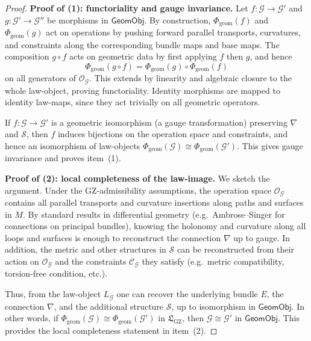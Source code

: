 \documentclass[11pt]{book}
\theoremstyle{plain}
\theoremstyle{definition}
\newcommand{\GZLS}{\ensuremath{\mathfrak{L}_{\mathrm{GZ}}}}       \newcommand{\GZLT}{\ensuremath{M_{!w}}}                           \newcommand{\GZLOC}{\ensuremath{A_M}}                             \newcommand{\GZLCurv}{\ensuremath{\mathcal{F}_{\mathrm{law}}}}
\begin{document}
\begin{proof}
\textbf{Proof of (1): functoriality and gauge invariance.}
Let \(f:\mathcal{G}\to\mathcal{G}'\) and
\(g:\mathcal{G}'\to\mathcal{G}''\) be morphisms in
\(\mathsf{GeomObj}\).  By construction,
\(\Phi_{\mathrm{geom}}(f)\) and \(\Phi_{\mathrm{geom}}(g)\) act on
operations by pushing forward parallel transports, curvatures, and
constraints along the corresponding bundle maps and base maps.  The
composition \(g\circ f\) acts on geometric data by first applying
\(f\) then \(g\), and hence
\[
  \Phi_{\mathrm{geom}}(g\circ f)
  =
  \Phi_{\mathrm{geom}}(g)\circ\Phi_{\mathrm{geom}}(f)
\]
on all generators of \(\mathcal{O}_{\mathcal{G}}\).  This extends by
linearity and algebraic closure to the whole law-object, proving
functoriality.  Identity morphisms are mapped to identity law-maps,
since they act trivially on all geometric operators.

If \(f:\mathcal{G}\to\mathcal{G}'\) is a geometric isomorphism (a
gauge transformation) preserving \(\nabla\) and \(\mathcal{S}\),
then \(f\) induces bijections on the operation space and constraints,
and hence an isomorphism of law-objects
\(\Phi_{\mathrm{geom}}(\mathcal{G})\cong\Phi_{\mathrm{geom}}(\mathcal{G}')\).
This gives gauge invariance and proves item~\textnormal{(1)}.



\medskip\noindent
\textbf{Proof of (2): local completeness of the law-image.}
We sketch the argument.  Under the GZ-admissibility assumptions, the
operation space \(\mathcal{O}_{\mathcal{G}}\) contains all parallel
transports and curvature insertions along paths and surfaces in \(M\).
By standard results in differential geometry (e.g.\ Ambrose–Singer for
connections on principal bundles), knowing the holonomy and curvature
along all loops and surfaces is enough to reconstruct the connection
\(\nabla\) up to gauge.  In addition, the metric and other structures
in \(\mathcal{S}\) can be reconstructed from their action on
\(\mathcal{O}_{\mathcal{G}}\) and the constraints
\(\mathcal{C}_{\mathcal{G}}\) they satisfy (e.g.\ metric compatibility,
torsion-free condition, etc.).

Thus, from the law-object \(L_{\mathcal{G}}\) one can recover the
underlying bundle \(E\), the connection \(\nabla\), and the additional
structure \(\mathcal{S}\), up to isomorphism in \(\mathsf{GeomObj}\).
In other words, if
\(\Phi_{\mathrm{geom}}(\mathcal{G})\cong\Phi_{\mathrm{geom}}(\mathcal{G}')\)
in \(\GZLS\), then \(\mathcal{G}\cong\mathcal{G}'\) in
\(\mathsf{GeomObj}\).  This provides the local completeness statement
in item~\textnormal{(2)}.




\end{proof}
\end{document}

